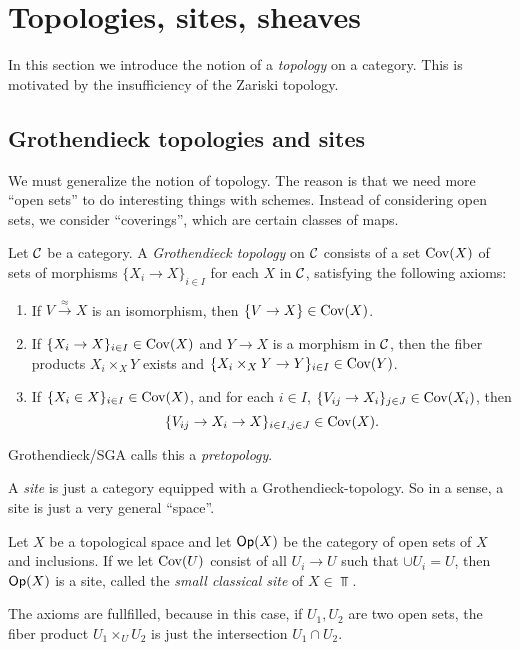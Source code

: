 \documentclass[11pt, english]{article}
\begin{document}
\section{Topologies, sites, sheaves}

In this section we introduce the notion of a \emph{topology} on a category. This is motivated by the insufficiency of the Zariski topology.
 
\subsection{Grothendieck topologies and sites}

We must generalize the notion of topology. The reason is that we need more ``open sets'' to do interesting things with schemes. Instead of considering open sets, we consider ``coverings'', which are certain classes of maps.

\begin{defi}
Let $\mathcal{C}$ be a category. A \emph{Grothendieck topology} on $\mathcal{C}$ consists of a set $\operatorname{Cov}(X)$ of sets of morphisms $\{ X_i \to X\}_{i \in I}$ for each $X$ in $\mathcal{C}$, satisfying the following axioms:
\begin{enumerate}
\item If $V \xrightarrow{\approx} X$ is an isomorphism, then $\{ V \to X\} \in \operatorname{Cov}(X)$.
\item If $\{X_i \to X\}_{i \in I} \in \operatorname{Cov}(X)$ and $Y \to X$ is a morphism in $\mathcal{C}$, then the fiber products $X_i \times_X Y$ exists and $\{ X_i \times_X Y \to Y\}_{i \in I} \in \operatorname{Cov}(Y)$.
\item If $\{X_i \in X\}_{i \in I} \in \operatorname{Cov}(X)$, and for each $i \in I$, $\{ V_{ij} \to X_i\}_{j \in J} \in  \operatorname{Cov}(X_i)$, then
\[
\{ V_{ij} \to X_i \to X\}_{i \in I, j \in J} \in \operatorname{Cov}(X).
\]
\end{enumerate}
\end{defi}
\begin{remark}
Grothendieck/SGA calls this a \emph{pretopology}. 
\end{remark}
A \emph{site} is just a category equipped with a Grothendieck-topology. So in a sense, a site is just a very general ``space''. 

\begin{example}
Let $X$ be a topological space and let $\mathsf{Op}(X)$ be the category of open sets of $X$ and inclusions. If we let $\operatorname{Cov}(U)$ consist of all $U_i \to U$ such that $\cup U_i=U$, then $\mathsf{Op}(X)$ is a site, called the \emph{small classical site} of $X \in \Top$. 

The axioms are fullfilled, because in this case, if $U_1,U_2$ are two open sets, the fiber product $U_1 \times_U U_2$ is just the intersection $U_1 \cap U_2$.
\end{example}
\end{document}
